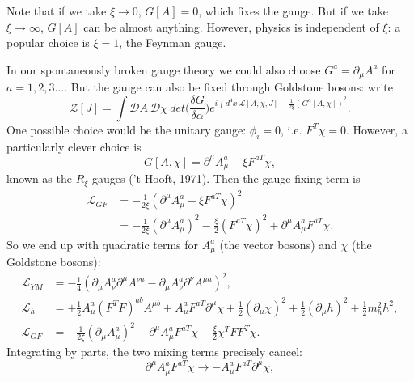 \documentclass[a4paper,12pt]{article}
\begin{document}
Note that if we take $\xi \to 0$, $G[A]=0$, which fixes the gauge. But if we take $\xi \to \infty$, $G[A]$ can be almost anything. However, physics is independent of $\xi$: a popular choice is $\xi =1$, the Feynman gauge.

In our spontaneously broken gauge theory we could also choose $G^a = \partial_\mu A^a$ for $a=1,2,3...$. But the gauge can also be fixed through Goldstone bosons: write
\begin{equation}
\mathcal{Z}[J]= \int \mathcal{D}A\ \mathcal{D}\chi\ det\bigg(\frac{\delta G}{\delta \alpha} \bigg) e^{i\int d^4x\ \mathcal{L}[A, \chi, J] - \frac{1}{2\xi}(G^a[A, \chi])^2}.
\end{equation}
One possible choice would be the unitary gauge: $\phi_i = 0$, i.e. $F^T\chi = 0$. However, a particularly clever choice is
\begin{equation}
G[A, \chi] = \partial^\mu A_\mu^a - \xi F^{a T}\chi,
\end{equation}
known as the $R_\xi$ gauges ('t Hooft, 1971). Then the gauge fixing term is
\begin{equation}
\begin{split}
\mathcal{L}_{GF} &= - \frac{1}{2\xi}(\partial^\mu A_\mu^a - \xi F^{a T}\chi)^2 \\
&= - \frac{1}{2 \xi}(\partial^\mu A_\mu^a)^2 - \frac{\xi}{2}(F^{a T}\chi)^2 + \partial^\mu A_\mu^a F^{a T}\chi.
\end{split}
\end{equation}
So we end up with quadratic terms for $A_\mu^a$ (the vector bosons) and $\chi$ (the Goldstone bosons):
\begin{equation}
\begin{split}
\mathcal{L}_{YM} &= -\frac{1}{4}(\partial_\mu A_\nu^a \partial^\mu A^{\nu a} - \partial_\mu A_\nu^a \partial^\nu A^{\mu a})^2, \\
\mathcal{L}_h &= + \frac{1}{2}A_\mu^a(F^TF)^{ab}A^{\mu b} + A_\mu^a F^{a T}\partial^\mu \chi + \frac{1}{2}(\partial_\mu \chi)^2 + \frac{1}{2}(\partial_\mu h)^2 + \frac{1}{2}m_h^2 h^2, \\
\mathcal{L}_{GF} &= - \frac{1}{2\xi}(\partial_\mu A_\mu^a)^2 + \partial^\mu A_\mu^a F^{a T} \chi - \frac{\xi}{2} \chi^T F F^T \chi.
\end{split}
\end{equation}
Integrating by parts, the two mixing terms precisely cancel:
\begin{equation}
\partial^\mu A_\mu^a F^{a T}\chi \to - A_\mu^a F^{a T} \partial^\mu \chi,
\end{equation}
\end{document}
